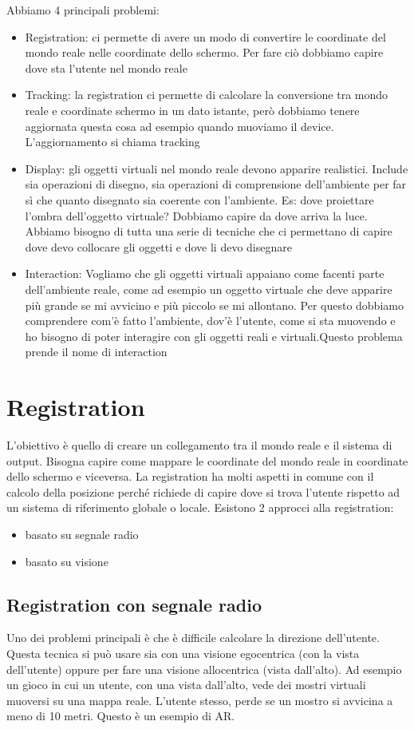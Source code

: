 Abbiamo 4 principali problemi:
\begin{itemize}
    \item Registration: ci permette di avere un modo di convertire le coordinate del mondo reale nelle coordinate dello schermo. Per fare ciò dobbiamo capire dove sta l'utente nel mondo reale
    \item Tracking: la registration ci permette di calcolare la conversione tra mondo reale e coordinate schermo in un dato istante, però dobbiamo tenere aggiornata questa cosa ad esempio quando muoviamo il device. L'aggiornamento si chiama tracking
    \item Display: gli oggetti virtuali nel mondo reale devono apparire realistici. Include sia operazioni di disegno, sia operazioni di comprensione dell'ambiente per far sì che quanto disegnato sia coerente con l’ambiente.
    Es: dove proiettare l'ombra dell'oggetto virtuale? Dobbiamo capire da dove arriva la luce. Abbiamo bisogno di tutta una serie di tecniche che ci permettano di capire dove devo collocare gli oggetti e dove li devo disegnare 
    \item Interaction: Vogliamo che gli oggetti virtuali appaiano come facenti parte dell'ambiente reale, come ad esempio un oggetto virtuale che deve apparire più grande se mi avvicino e più piccolo se mi allontano.
    Per questo dobbiamo comprendere com'è fatto l'ambiente, dov'è l'utente, come si sta muovendo e ho bisogno di poter interagire con gli oggetti reali e virtuali.Questo problema prende il nome di interaction
\end{itemize}



\section{Registration}
L'obiettivo è quello di creare un collegamento tra il mondo reale e il sistema di output. 
Bisogna capire come mappare le coordinate del mondo reale in coordinate dello schermo e viceversa. 
La registration ha molti aspetti in comune con il calcolo della posizione perché richiede di capire dove si trova l'utente rispetto ad un sistema di riferimento globale o locale.
Esistono 2 approcci alla registration:
\begin{itemize}
    \item basato su segnale radio
    \item basato su visione
\end{itemize}

\subsection{Registration con segnale radio}
Uno dei problemi principali è che è difficile calcolare la direzione dell'utente. 
Questa tecnica si può usare sia con una visione egocentrica (con la vista dell'utente) oppure per fare una visione allocentrica (vista dall'alto). 
Ad esempio un gioco in cui un utente, con una vista dall'alto, vede dei mostri virtuali muoversi su una mappa reale. L'utente stesso, perde se un mostro si avvicina a meno di 10 metri. Questo è un esempio di AR.  

